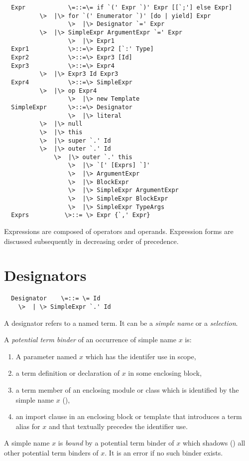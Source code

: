 \documentclass[11pt]{report}
\begin{document}
\syntax\begin{verbatim}
  Expr            \=::=\= if `(' Expr `)' Expr [[`;'] else Expr]
		  \>  |\> for `(' Enumerator `)' [do | yield] Expr
                  \>  |\> Designator `=' Expr
		  \>  |\> SimpleExpr ArgumentExpr `=' Expr
                  \>  |\> Expr1
  Expr1           \>::=\> Expr2 [`:' Type]
  Expr2           \>::=\> Expr3 [Id]
  Expr3           \>::=\> Expr4
		  \>  |\> Expr3 Id Expr3
  Expr4           \>::=\> SimpleExpr
		  \>  |\> op Expr4
                  \>  |\> new Template
  SimpleExpr      \>::=\> Designator
                  \>  |\> literal
		  \>  |\> null
		  \>  |\> this
		  \>  |\> super `.' Id
		  \>  |\> outer `.' Id
	          \>  |\> outer `.' this
                  \>  |\> `[' [Exprs] `]'
                  \>  |\> ArgumentExpr
                  \>  |\> BlockExpr
                  \>  |\> SimpleExpr ArgumentExpr
                  \>  |\> SimpleExpr BlockExpr
                  \>  |\> SimpleExpr TypeArgs
  Exprs          \>::= \> Expr {`,' Expr}
\end{verbatim}

Expressions are composed of operators and operands. Expression forms are
discussed subsequently in decreasing order of precedence.

\section{Designators}
\label{sec:designators}

\syntax\begin{verbatim}
  Designator    \=::= \= Id
	\>  | \> SimpleExpr `.' Id
\end{verbatim}

A designator refers to a named term. It can be a {\em simple name} or
a {\em selection}.

A {\em potential term binder} of an occurrence of simple name $x$ is:
\begin{enumerate}
\item A parameter named $x$ which has the identifer use in scope,
\item a term definition or declaration of $x$ in some enclosing block,
\item a term member of an enclosing module or class which is identified
      by the simple name $x$ (),
\item an import clause in an enclosing block or template that introduces
      a term alias for $x$ and that textually precedes the identifier use.
\end{enumerate}
A simple name $x$ is {\em bound} by a potential term binder of $x$
which shadows () all other potential term binders of
$x$.  It is an error if no such binder exists.
\end{document}
